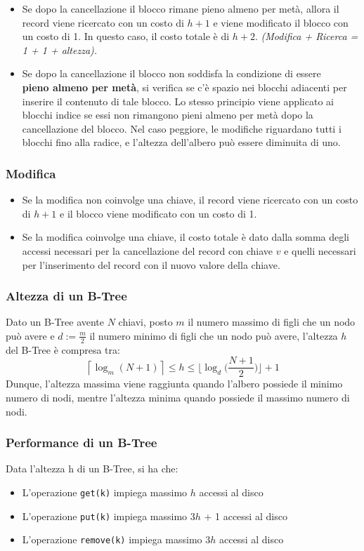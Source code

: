 \documentclass{article}
\begin{document}
\begin{itemize}
    \item Se dopo la cancellazione il blocco rimane pieno almeno per metà, allora il record viene ricercato con un costo di $h+1$ e viene modificato il blocco con un costo di 1. In questo caso, il costo totale è di $h+2$. \textit{(Modifica + Ricerca = 1 + 1 + altezza).}
    \item Se dopo la cancellazione il blocco non soddisfa la condizione di essere \\\textbf{pieno almeno per metà}, si verifica se c'è spazio nei blocchi adiacenti per inserire il contenuto di tale blocco. Lo stesso principio viene applicato ai blocchi indice se essi non rimangono pieni almeno per metà dopo la cancellazione del blocco. Nel caso peggiore, le modifiche riguardano tutti i blocchi fino alla radice, e l'altezza dell'albero può essere diminuita di uno.
\end{itemize}

\subsubsection{Modifica}
\begin{itemize}
  \item Se la modifica non coinvolge una chiave, il record viene ricercato con un costo di $h+1$ e il blocco viene modificato con un costo di 1.
  \item Se la modifica coinvolge una chiave, il costo totale è dato dalla somma degli accessi necessari per la cancellazione del record con chiave $v$ e quelli necessari per l'inserimento del record con il nuovo valore della chiave.
\end{itemize}

\subsubsection{Altezza di un B-Tree}
Dato un B-Tree avente $N$ chiavi, posto $m$ il numero massimo di figli che un nodo può avere e $d := \frac{m}{2}$ il numero minimo di figli che un nodo può avere, l'altezza $h$ del B-Tree è compresa tra:
\[
\left\lceil \log_m(N+1) \right\rceil \leq h \leq \biggl\lfloor \log_d \biggl( \frac{N+1}{2} \biggr) \biggr\rfloor + 1
\]
Dunque, l'altezza massima viene raggiunta quando l'albero possiede il minimo numero di nodi, mentre l'altezza minima quando possiede il massimo numero di nodi.
\subsubsection{Performance di un B-Tree}
Data l'altezza h di un B-Tree, si ha che:
\begin{itemize}
  \item L'operazione \texttt{get(k)} impiega massimo $h$ accessi al disco
  \item L'operazione \texttt{put(k)} impiega massimo 3$h$ + 1 accessi al disco 
  \item L'operazione \texttt{remove(k)} impiega massimo 3$h$ accessi al disco
\end{itemize}
\end{document}
